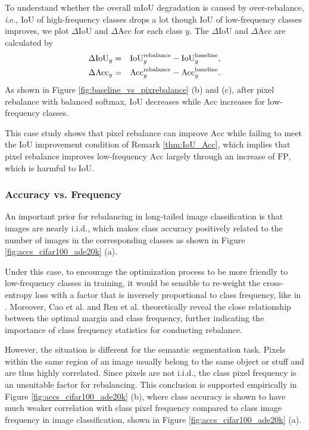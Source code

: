 \documentclass[final]{cvpr}
\begin{document}
To understand whether the overall $\mathrm{mIoU}$ degradation is caused by over-rebalance, {\textit i.e.}, $\mathrm{IoU}$ of high-frequency classes drops a lot though $\mathrm{IoU}$ of low-frequency classes improves, we plot $\Delta \mathrm{IoU}$ and $\Delta \mathrm{Acc}$ for each class $y$. The $\Delta \mathrm{IoU}$ and $\Delta \mathrm{Acc}$ are calculated by
\begin{eqnarray}
   \Delta \mathrm{IoU}_{y} &=& \mathrm{IoU}_{y}^{\rm{rebalance}} - \mathrm{IoU}_{y}^{\rm{baseline}}, \\
   \Delta \mathrm{Acc}_{y} &=& \mathrm{Acc}_{y}^{\rm{rebalance}} - \mathrm{Acc}_{y}^{\rm{baseline}}.
\end{eqnarray}
As shown in Figure \ref{fig:baseline_vs_pixrebalance} (b) and (c), after pixel rebalance with balanced softmax, $\mathrm{IoU}$ decreases while $\mathrm{Acc}$ increases for low-frequency classes. 

This case study shows that pixel rebalance can improve $\mathrm{Acc}$ while failing to meet the $\mathrm{IoU}$ improvement condition of Remark \ref{thm:IoU_Acc}, which implies that pixel rebalance improves low-frequency $\mathrm{Acc}$ largely through an increase of $\mathrm{FP}$, which is harmful to $\mathrm{IoU}$.


\subsubsection{Accuracy vs. Frequency}
\label{sec:challenge2}
An important prior for rebalancing in long-tailed image classification is that images are nearly i.i.d., which makes class accuracy positively related to the number of images in the corresponding classes as shown in Figure \ref{fig:accs_cifar100_ade20k} (a). 

Under this case, to encourage the optimization process to be more friendly to low-frequency classes in training, it would be sensible to re-weight the cross-entropy loss with a factor that is inversely proportional to class frequency, like in \cite{cb-focal}. Moreover, Cao et al. \cite{cao2019learning} and Ren et al. \cite{DBLP:conf/nips/RenYSMZYL20} theoretically reveal the close relationship between the optimal margin and class frequency, further indicating the importance of class frequency statistics for conducting rebalance.


However, the situation is different for the semantic segmentation task. Pixels within the same region of an image usually belong to the same object or stuff and are thus highly correlated. Since pixels are not i.i.d., the class pixel frequency is an unsuitable factor for rebalancing. This conclusion is supported empirically in Figure \ref{fig:accs_cifar100_ade20k} (b), where class accuracy is shown to have much weaker correlation with class pixel frequency compared to class image frequency in image classification, shown in Figure \ref{fig:accs_cifar100_ade20k} (a).
\end{document}
